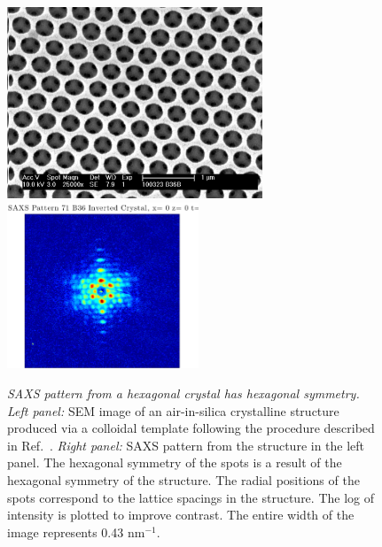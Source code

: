 \begin{figure}[htbp]
\centering
\includegraphics[width=3in]{figures/B36TEOSBurnedOut.pdf}
\hspace{0.5in}
\includegraphics[width=2.25in]{figures/B36InvertedSAXS.pdf}
\caption{\label{fig:crystalSAXS} \emph{SAXS pattern from a hexagonal crystal has hexagonal symmetry.}
	\emph{Left panel:} SEM image of an air-in-silica crystalline structure produced via a colloidal template following the procedure described in Ref.~\cite{Hatton:2010}.
	\emph{Right panel:} SAXS pattern from the structure in the left panel. The hexagonal symmetry of the spots is a result of the hexagonal symmetry of the structure. The radial positions of the spots correspond to the lattice spacings in the structure. The log of intensity is plotted to improve contrast. The entire width of the image represents 0.43 nm$^{-1}$.}
\end{figure}

